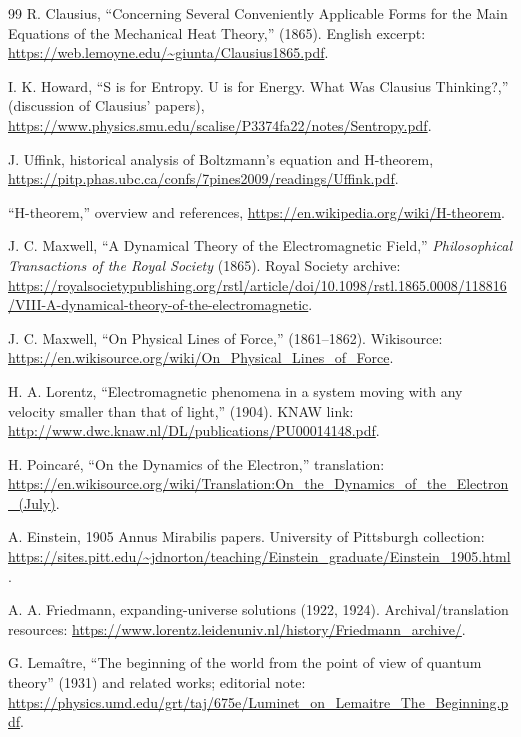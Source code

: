 \documentclass[11pt]{article}
\begin{document}
\begin{thebibliography}{99}
 R. Clausius, ``Concerning Several Conveniently Applicable Forms for the Main Equations of the Mechanical Heat Theory,'' (1865). English excerpt: \url{https://web.lemoyne.edu/~giunta/Clausius1865.pdf}.

 I. K. Howard, ``S is for Entropy. U is for Energy. What Was Clausius Thinking?,'' (discussion of Clausius’ papers), \url{https://www.physics.smu.edu/scalise/P3374fa22/notes/Sentropy.pdf}.

 J. Uffink, historical analysis of Boltzmann’s equation and H-theorem, \url{https://pitp.phas.ubc.ca/confs/7pines2009/readings/Uffink.pdf}.

 ``H-theorem,'' overview and references, \url{https://en.wikipedia.org/wiki/H-theorem}.

 J. C. Maxwell, ``A Dynamical Theory of the Electromagnetic Field,'' \textit{Philosophical Transactions of the Royal Society} (1865). Royal Society archive: \url{https://royalsocietypublishing.org/rstl/article/doi/10.1098/rstl.1865.0008/118816/VIII-A-dynamical-theory-of-the-electromagnetic}.

 J. C. Maxwell, ``On Physical Lines of Force,'' (1861–1862). Wikisource: \url{https://en.wikisource.org/wiki/On_Physical_Lines_of_Force}.

 H. A. Lorentz, ``Electromagnetic phenomena in a system moving with any velocity smaller than that of light,'' (1904). KNAW link: \url{http://www.dwc.knaw.nl/DL/publications/PU00014148.pdf}.

 H. Poincar\'e, ``On the Dynamics of the Electron,'' translation: \url{https://en.wikisource.org/wiki/Translation:On_the_Dynamics_of_the_Electron_(July)}.

 A. Einstein, 1905 Annus Mirabilis papers. University of Pittsburgh collection: \url{https://sites.pitt.edu/~jdnorton/teaching/Einstein_graduate/Einstein_1905.html}.

 A. A. Friedmann, expanding-universe solutions (1922, 1924). Archival/translation resources: \url{https://www.lorentz.leidenuniv.nl/history/Friedmann_archive/}.

 G. Lema\^itre, ``The beginning of the world from the point of view of quantum theory'' (1931) and related works; editorial note: \url{https://physics.umd.edu/grt/taj/675e/Luminet_on_Lemaitre_The_Beginning.pdf}.


\end{thebibliography}
\end{document}
